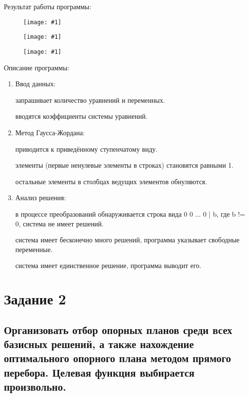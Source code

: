 \documentclass{report}
\newcommand{\drawzalupa}[2]{
	\begin{figure}[H]
		\centering
		\texttt{[image: \#1]}
	\end{figure}
}
\begin{document}
	\newpage
	
	Результат работы программы:
	
	\drawzalupa{images/task1.png}{1}
	
	\drawzalupa{images/task12.png}{1}
	
	\drawzalupa{images/task13.png}{1}
	
	\newpage
	
	Описание программы:
	\begin{enumerate}
		\item{Ввод данных:}
		
			\begin{itemize}
				 запрашивает количество уравнений и переменных.
			
				 вводятся коэффициенты системы уравнений.
			\end{itemize}
		
		\item{Метод Гаусса-Жордана:}
		
			\begin{itemize}
				 приводится к приведённому ступенчатому виду.
			
				 элементы (первые ненулевые элементы в строках) становятся равными 1.
			
				 остальные элементы в столбцах ведущих элементов обнуляются.
			\end{itemize}
		
		\item{Анализ решения:}
		
			\begin{itemize}
				 в процессе преобразований обнаруживается строка вида 0 0 ... 0 | b, где b != 0, система не имеет решений.
			
				 система имеет бесконечно много решений, программа указывает свободные переменные.
			
				 система имеет единственное решение, программа выводит его.
			\end{itemize}
			
	\end{enumerate}
	\chapter{Задание 2}
	\section{Организовать отбор опорных планов среди всех базисных решений,
	а также нахождение оптимального опорного плана методом
	прямого перебора. Целевая функция выбирается произвольно.}
	
\end{document}
